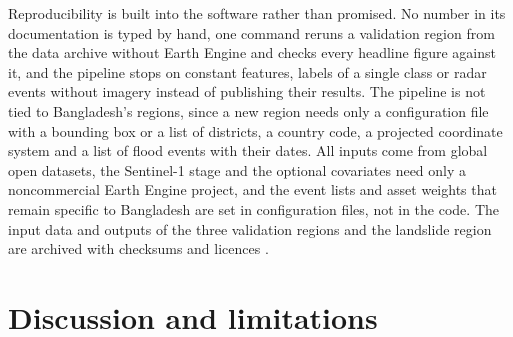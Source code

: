 \documentclass[preprint,12pt]{elsarticle}
\begin{document}
Reproducibility is built into the software rather than promised. No number in its documentation is typed by hand, one command reruns a validation region from the data archive without Earth Engine and checks every headline figure against it, and the pipeline stops on constant features, labels of a single class or radar events without imagery instead of publishing their results. The pipeline is not tied to Bangladesh's regions, since a new region needs only a configuration file with a bounding box or a list of districts, a country code, a projected coordinate system and a list of flood events with their dates. All inputs come from global open datasets, the Sentinel-1 stage and the optional covariates need only a noncommercial Earth Engine project, and the event lists and asset weights that remain specific to Bangladesh are set in configuration files, not in the code. The input data and outputs of the three validation regions and the landslide region are archived with checksums and licences \citep{hasan2026data}.

\section{Discussion and limitations}
\end{document}

